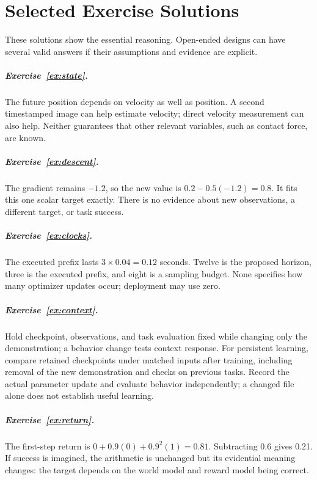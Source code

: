\chapter{Selected Exercise Solutions}
\label{app:solutions}
These solutions show the essential reasoning. Open-ended designs can have several valid answers if their assumptions and evidence are explicit.

\paragraph{Exercise~\ref{ex:state}.} The future position depends on velocity as well as position. A second timestamped image can help estimate velocity; direct velocity measurement can also help. Neither guarantees that other relevant variables, such as contact force, are known.

\paragraph{Exercise~\ref{ex:descent}.} The gradient remains $-1.2$, so the new value is $0.2-0.5(-1.2)=0.8$. It fits this one scalar target exactly. There is no evidence about new observations, a different target, or task success.

\paragraph{Exercise~\ref{ex:clocks}.} The executed prefix lasts $3\times0.04=0.12$ seconds. Twelve is the proposed horizon, three is the executed prefix, and eight is a sampling budget. None specifies how many optimizer updates occur; deployment may use zero.

\paragraph{Exercise~\ref{ex:context}.} Hold checkpoint, observations, and task evaluation fixed while changing only the demonstration; a behavior change tests context response. For persistent learning, compare retained checkpoints under matched inputs after training, including removal of the new demonstration and checks on previous tasks. Record the actual parameter update and evaluate behavior independently; a changed file alone does not establish useful learning.

\paragraph{Exercise~\ref{ex:return}.} The first-step return is $0+0.9(0)+0.9^2(1)=0.81$. Subtracting 0.6 gives 0.21. If success is imagined, the arithmetic is unchanged but its evidential meaning changes: the target depends on the world model and reward model being correct.

